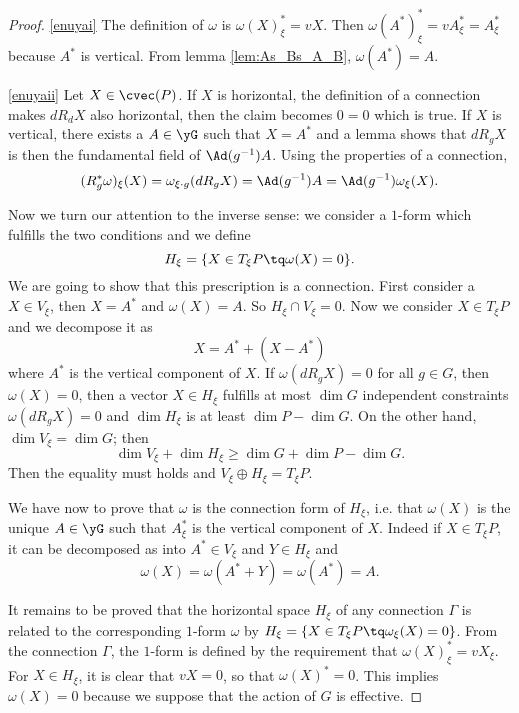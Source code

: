 \begin{proof}
\ref{enuyai} The definition of $\omega$ is $\omega(X)^*_{\xi}=vX$. Then $\omega(A^*)^*_{\xi}=vA^*_{\xi}=A^*_{\xi}$ because $A^*$ is vertical. From lemma \ref{lem:As_Bs_A_B}, $\omega(A^*)=A$.

\ref{enuyaii} Let $X\in\cvec(P)$. If $X$ is horizontal, the definition of a connection makes $dR_d X$ also horizontal, then the claim becomes $0=0$ which is true. If $X$ is vertical, there exists a $A\in\yG$ such that $X=A^*$ and a lemma shows that $dR_gX$ is then the fundamental field of $\Ad(g^{-1})A$. Using the properties of a connection,
\begin{equation}
  (R^*_g\omega)_{\xi}(X)=\omega_{\xi\cdot g}(dR_g X)=\Ad(g^{-1})A=\Ad(g^{-1})\omega_{\xi}(X).
\end{equation}

Now we turn our attention to the inverse sense: we consider a $1$-form which fulfills the two conditions and we define
\begin{equation}
   H_{\xi}=\{X\in T_{\xi} P\tq \omega(X)=0\}.
\end{equation}
We are going to show that this prescription is a connection. First consider a $X\in V_{\xi}$, then $X=A^*$ and $\omega(X)=A$. So $H_{\xi}\cap V_{\xi}=0$. Now we consider $X\in T_{\xi} P$ and we decompose it as
\[
   X=A^*+(X-A^*)
\]
where $A^*$ is the vertical component of $X$. If $\omega(dR_g X)=0$ for all $g\in G$, then $\omega(X)=0$, then a vector $X\in H_{\xi}$ fulfills at most $\dim G$ independent constraints $\omega(dR_g X)=0$ and $\dim H_{\xi}$ is at least $\dim P-\dim G$. On the other hand, $\dim V_{\xi}=\dim G$; then
\[
  \dim V_{\xi}+\dim H_{\xi}\geq\dim G+\dim P-\dim G.
\]
Then the equality must holds and $V_{\xi}\oplus H_{\xi}=T_{\xi} P$.

We have now to prove that $\omega$ is the connection form of $H_{\xi}$, i.e. that $\omega(X)$ is the unique $A\in\yG$ such that $A^*_{\xi}$ is the vertical component of $X$. Indeed if $X\in T_{\xi} P$, it can be decomposed as into $A^*\in V_{\xi}$ and $Y\in H_{\xi}$ and
\[
   \omega(X)=\omega(A^*+Y)=\omega(A^*)=A.   
\]

It remains to be proved that the horizontal space $H_{\xi}$ of any connection $\Gamma$ is related to the corresponding $1$-form $\omega$ by $H_{\xi}=\{X\in T_{\xi} P\tq\omega_{\xi}(X)=0\}$. From the connection $\Gamma$, the $1$-form is defined by the requirement that $\omega(X)^*_{\xi}=vX_{\xi}$. For $X\in H_{\xi}$, it is clear that $vX=0$, so that $\omega(X)^*=0$. This implies $\omega(X)=0$ because we suppose that the action of $G$ is effective.

\end{proof}

